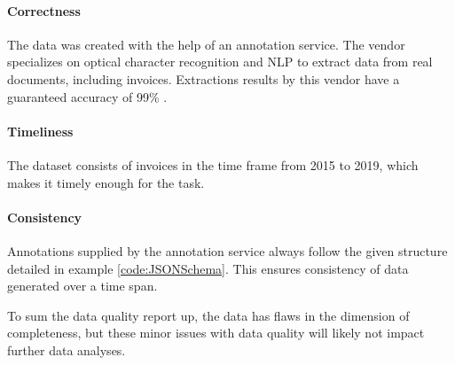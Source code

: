 \paragraph{Correctness}
The data was created with the help of an annotation service. The vendor specializes on optical character recognition and \acf{NLP} to extract data from real documents, including invoices. Extractions results by this vendor have a guaranteed accuracy of 99\% \cite{scaleaiScaleDocumentAI}.
\paragraph{Timeliness}
The dataset consists of invoices in the time frame from 2015 to 2019, which makes it timely enough for the task.
\paragraph{Consistency}
 Annotations supplied by the annotation service always follow the given structure detailed in example \ref{code:JSONSchema}. This ensures consistency of data generated over a time span.
 
 To sum the data quality report up, the data has flaws in the dimension of completeness, but these minor issues with data quality will likely not impact further data analyses.
